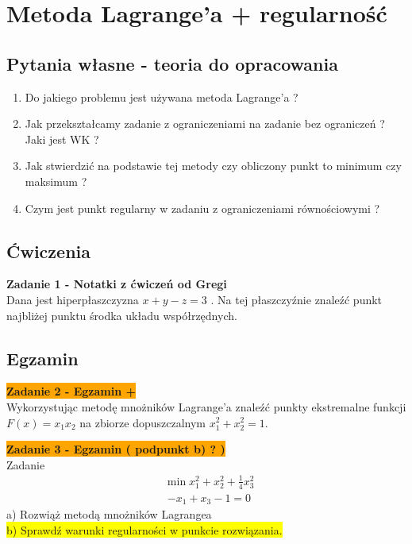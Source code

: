 \documentclass[a4paper,11pt]{article}
\begin{document}
\newpage
\section{Metoda Lagrange'a + regularność}

\subsection{Pytania własne - teoria do opracowania}
\begin{enumerate}

\item Do jakiego problemu jest używana metoda Lagrange'a ?
\item Jak przekształcamy zadanie z ograniczeniami na zadanie bez ograniczeń ? Jaki jest WK ?
\item Jak stwierdzić na podstawie tej metody czy obliczony punkt to minimum czy maksimum ?
\item Czym jest punkt regularny w zadaniu z ograniczeniami równościowymi ?


\end{enumerate}

\subsection{Ćwiczenia}

\begin{framed}
\textbf{Zadanie 1 - Notatki z ćwiczeń od Gregi } \\
Dana jest hiperpłaszczyzna \( x+y-z=3 \) . Na tej płaszczyźnie znaleźć punkt najbliżej punktu środka układu współrzędnych.
\end{framed}

\subsection{Egzamin}

\begin{framed}
\textbf{\colorbox{orange}{Zadanie 2 - Egzamin +}} \\
Wykorzystując metodę mnożników Lagrange'a znaleźć punkty ekstremalne funkcji \\ \( F(x) = x_1x_2 \) na zbiorze dopuszczalnym \( x_1^2+x_2^2  = 1\).
\end{framed}

\begin{framed}
\textbf{\colorbox{orange}{Zadanie 3 - Egzamin ( podpunkt b) ? ) }} \\
Zadanie
\begin{align*}
&\text{min} \; x_1^2 + x_2^2 + \frac{1}{4}x_3^2 \\
&-x_1+x_3-1=0
\end{align*}
a) Rozwiąż metodą mnożników Lagrangea \\
\colorbox{yellow}{b) Sprawdź warunki regularności w punkcie rozwiązania.}
\end{framed}
\end{document}
